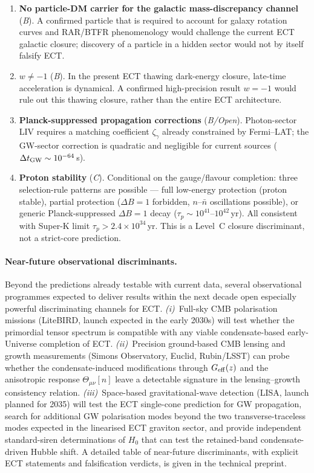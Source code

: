 \documentclass[11pt,a4paper]{article}
\begin{document}
\begin{enumerate}
\item \textbf{No particle-DM carrier for the galactic mass-discrepancy channel} (\emph{B}). A confirmed particle that is required to account for galaxy rotation curves and RAR/BTFR phenomenology would challenge the current ECT galactic closure; discovery of a particle in a hidden sector would not by itself falsify ECT.

\item \textbf{$w \neq -1$} (\emph{B}). In the present ECT thawing dark-energy closure, late-time acceleration is dynamical. A confirmed high-precision result $w=-1$ would rule out this thawing closure, rather than the entire ECT architecture.

\item \textbf{Planck-suppressed propagation corrections} (\emph{B/Open}). Photon-sector LIV requires a matching coefficient $\zeta_\gamma$ already constrained by Fermi--LAT; the GW-sector correction is quadratic and negligible for current sources ($\Delta t_{\rm GW}\sim10^{-64}$\,s).

\item \textbf{Proton stability} (\emph{C}). Conditional on the gauge/flavour completion: three selection-rule patterns are possible --- full low-energy protection (proton stable), partial protection ($\Delta B\!=\!1$ forbidden, $n$--$\bar n$ oscillations possible), or generic Planck-suppressed $\Delta B\!=\!1$ decay ($\tau_p \sim 10^{41}$--$10^{42}\,$yr). All consistent with Super-K limit $\tau_p > 2.4\times 10^{34}\,$yr. This is a Level~C closure discriminant, not a strict-core prediction.
\end{enumerate}

\paragraph{Near-future observational discriminants.}
Beyond the predictions already testable with current data,
several observational programmes expected to deliver results
within the next decade open especially powerful discriminating
channels for ECT\@.
\emph{(i)}~Full-sky CMB polarisation missions (LiteBIRD, launch
expected in the early 2030s) will test whether the primordial
tensor spectrum is compatible with any viable condensate-based
early-Universe completion of ECT\@.
\emph{(ii)}~Precision ground-based CMB lensing and growth
measurements (Simons Observatory, Euclid, Rubin/LSST) can probe
whether the condensate-induced modifications through $G_{\rm eff}(z)$
and the anisotropic response $\Theta_{\mu\nu}[n]$ leave a detectable
signature in the lensing--growth consistency relation.
\emph{(iii)}~Space-based gravitational-wave detection (LISA, launch
planned for 2035) will test the ECT single-cone prediction for GW
propagation, search for additional GW polarisation modes beyond the
two transverse-traceless modes expected in the linearised ECT
graviton sector, and provide independent standard-siren
determinations of $H_0$ that can test the retained-band
condensate-driven Hubble shift.
A detailed table of near-future discriminants, with explicit
ECT statements and falsification verdicts, is given in the
technical preprint.
\end{document}
